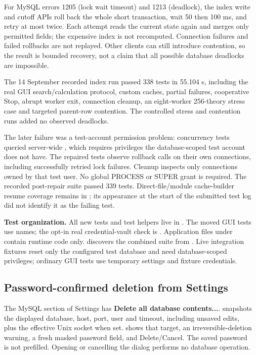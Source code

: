 For MySQL errors 1205 (lock wait timeout) and 1213 (deadlock), the index write
and cutoff APIs roll back the whole short transaction, wait 50 then 100 ms,
and retry at most twice. Each attempt reads the current state again and merges
only permitted fields; the expensive index is not recomputed. Connection
failures and failed rollbacks are not replayed. Other clients can still
introduce contention, so the result is bounded recovery, not a claim that all
possible database deadlocks are impossible.

The 14 September recorded index run passed 338 tests in 55.104 s, including
the real GUI search/calculation protocol, custom caches, partial failures,
cooperative Stop, abrupt worker exit, connection cleanup, an eight-worker
256-theory stress case and targeted parent-row contention. The controlled
stress and contention runs added no observed deadlocks.

The later  failure was a test-account permission problem:
concurrency tests queried server-wide , which requires
privileges the database-scoped test account does not have. The repaired tests
observe rollback calls on their own connections, including successfully retried
lock failures. Cleanup inspects only connections owned by that test user.
No global PROCESS or SUPER grant is required. The recorded post-repair suite
passed 339 tests. Direct-file/module cache-builder resume coverage remains in
; its appearance at the start of
the submitted test log did not identify it as the failing test.

\textbf{Test organization.} All new tests and test helpers live in .
The moved GUI tests use  names; the opt-in real credential-vault
check is . Application files under
 contain runtime code only.  discovers the combined
suite from . Live integration fixtures reset only the configured
test database and need database-scoped privileges; ordinary GUI tests use
temporary settings and fixture credentials.

\clearpage
\subsection{Password-confirmed deletion from Settings}
\label{sec:delete-settings}
The MySQL section of Settings has \textbf{Delete all database contents...}.
 snapshots the displayed database, host, port, user and
timeout, including unsaved edits, plus the effective Unix socket when set.
 shows that target, an irreversible-deletion warning,
a fresh masked password field, and Delete/Cancel. The saved password is not
prefilled. Opening or cancelling the dialog performs no database operation.

